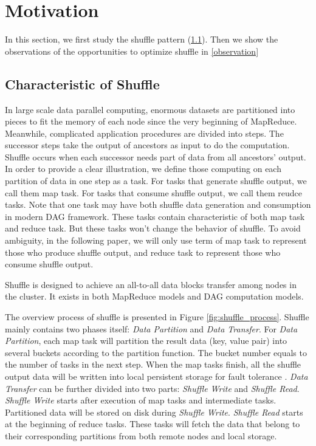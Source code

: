 \section{Motivation}

In this section, we first study the shuffle pattern (\ref{shuffle pattern}). 
Then we show the observations of the opportunities to optimize shuffle in \ref{observation}
\subsection{Characteristic of Shuffle} \label{shuffle pattern}

In large scale data parallel computing, enormous datasets are partitioned into pieces to fit the memory of each node since the very beginning of MapReduce\cite{mapreduce}.
Meanwhile, complicated application procedures are divided into steps. The successor steps take the output of ancestors as input to do the computation. Shuffle occurs when each successor needs 
part of data from all ancestors' output. In order to provide a clear illustration, we define those computing on each partition of data in one step as a task. For tasks that generate shuffle output, we call
them map task. For tasks that consume shuffle output, we call them reudce tasks. Note that one task may have both shuffle data generation and consumption in modern DAG framework. These tasks contain characteristic of both map task and reduce task. But these tasks won't change the behavior of shuffle. To avoid ambiguity, in the following paper, we will only use term of map task to represent those who produce shuffle output, and reduce task to represent those who consume shuffle output.

Shuffle is designed to achieve an all-to-all data blocks transfer among nodes in the cluster. It exists in both MapReduce models and DAG computation models.

The overview process of shuffle is presented in Figure \ref{fig:shuffle_process}. Shuffle mainly contains two phases itself: \textit{Data Partition} and \textit{Data Transfer}. For \textit{Data Partition}, each map task will partition the result data (key, value pair) into several buckets according to the partition function.
The bucket number equals to the number of tasks in the next step. When the map tasks finish, all the shuffle output data will be written into local persistent storage for fault tolerance \cite{mapreduce, spark}.
\textit{Data Transfer} can be further divided into two parts: \textit{Shuffle Write} and \textit{Shuffle Read}. \textit{Shuffle Write} starts after execution of map tasks and intermediate tasks. Partitioned data will  be stored on disk during \textit{Shuffle Write}. \textit{Shuffle Read} starts at the beginning of reduce tasks. These tasks will fetch the data that belong to their corresponding partitions from both remote nodes and local storage.

